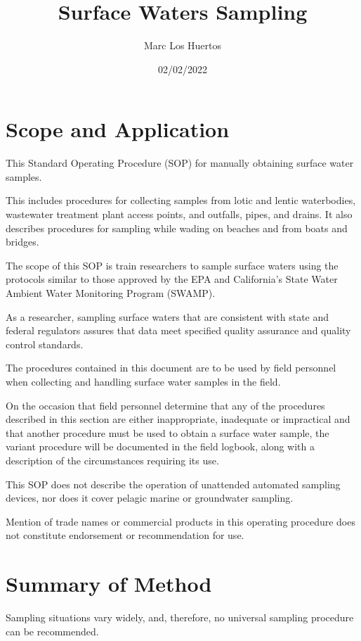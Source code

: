\documentclass[12pt]{../SOP4_alpha}\usepackage[]{graphicx}\usepackage[]{xcolor}
\title{Surface Waters Sampling}
\date{02/02/2022}
\author{Marc Los Huertos}
\begin{document}
\maketitle

\section{Scope and Application}

\NP This Standard Operating Procedure (SOP) for manually obtaining surface water samples.  

\NP This includes procedures for collecting samples from lotic and lentic waterbodies, wastewater treatment plant access points, and outfalls, pipes, and drains. It also describes procedures for sampling while wading on beaches and from boats and bridges.

\NP The scope of this SOP is train researchers to sample surface waters using the protocols similar to those approved by the EPA and California's State Water Ambient Water Monitoring Program (SWAMP). 

\NP As a researcher, sampling surface waters that are consistent with state and federal regulators assures that data meet specified quality assurance and quality control standards.

\NP The procedures contained in this document are to be used by field personnel when collecting and handling surface water samples in the field.  

\NP On the occasion that field personnel determine that any of the procedures described in this section are either inappropriate, inadequate or impractical and that another procedure must be used to obtain a surface water sample, the variant procedure will be documented in the field logbook, along with a description of the circumstances requiring its use.  

\NP  This SOP does not describe the operation of unattended automated sampling devices, nor does it cover pelagic marine or groundwater sampling. 

\NP Mention of trade names or commercial products in this operating procedure does not constitute endorsement or recommendation for use.

\section{Summary of Method}

\NP Sampling situations vary widely, and, therefore, no universal sampling procedure can be
recommended.
\end{document}
